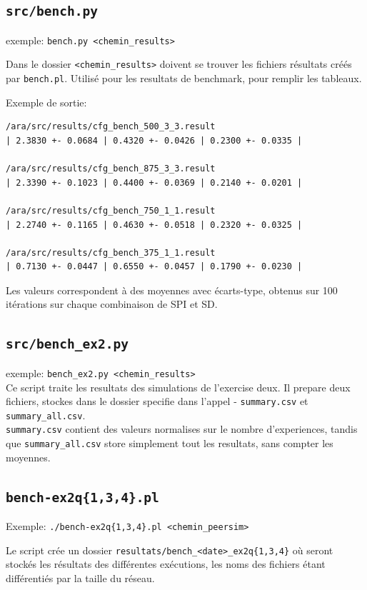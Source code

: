 \documentclass[a4paper]{article}
\begin{document}
\begin{appendix}
    \subsection{\texttt{src/bench.py}}
    exemple: \texttt{bench.py <chemin\_results>}

    Dans le dossier \texttt{<chemin\_results>} doivent se trouver les fichiers résultats créés par \texttt{bench.pl}. Utilisé pour les resultats de benchmark, pour remplir les tableaux.

Exemple de sortie:
\begin{verbatim}
/ara/src/results/cfg_bench_500_3_3.result
| 2.3830 +- 0.0684 | 0.4320 +- 0.0426 | 0.2300 +- 0.0335 |

/ara/src/results/cfg_bench_875_3_3.result
| 2.3390 +- 0.1023 | 0.4400 +- 0.0369 | 0.2140 +- 0.0201 |

/ara/src/results/cfg_bench_750_1_1.result
| 2.2740 +- 0.1165 | 0.4630 +- 0.0518 | 0.2320 +- 0.0325 |

/ara/src/results/cfg_bench_375_1_1.result
| 0.7130 +- 0.0447 | 0.6550 +- 0.0457 | 0.1790 +- 0.0230 |
\end{verbatim}
Les valeurs correspondent à des moyennes avec écarts-type, obtenus sur
100 itérations sur chaque combinaison de SPI et SD.



\subsection{\texttt{src/bench\_ex2.py}}
exemple: \texttt{bench\_ex2.py <chemin\_results>}\\
Ce script traite les resultats des simulations de l'exercise deux. Il prepare deux fichiers, stockes dans le dossier specifie dans l'appel - \texttt{summary.csv} et \texttt{summary\_all.csv}.\\

\texttt{summary.csv} contient des valeurs normalises sur le nombre d'experiences, tandis que \texttt{summary\_all.csv} store simplement tout les resultats, sans compter les moyennes.


\subsection{\texttt{bench-ex2q\{1,3,4\}.pl}}
Exemple: \texttt{./bench-ex2q\{1,3,4\}.pl <chemin\_peersim>}

Le script crée un dossier \texttt{resultats/bench\_<date>\_ex2q\{1,3,4\}} où
seront stockés les résultats des différentes exécutions, les noms des fichiers
étant différentiés par la taille du réseau.


\end{appendix}
\end{document}
